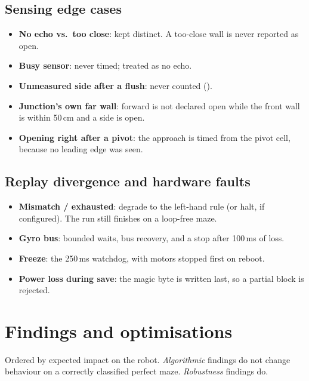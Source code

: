 \documentclass[11pt,a4paper]{article}
\newcommand{\code}[1]{\texttt{\detokenize{#1}}}
\theoremstyle{plain}
\theoremstyle{definition}
\begin{document}
\subsection{Sensing edge cases}
\begin{itemize}
  \item \textbf{No echo vs.\ too close}: kept distinct. A too-close wall is
        never reported as open.
  \item \textbf{Busy sensor}: never timed; treated as no echo.
  \item \textbf{Unmeasured side after a flush}: never counted
        (\code{Sonar_HasSample}).
  \item \textbf{Junction's own far wall}: forward is not declared open while
        the front wall is within 50\,cm and a side is open.
  \item \textbf{Opening right after a pivot}: the approach is timed from
        the pivot cell, because no leading edge was seen.
\end{itemize}

\subsection{Replay divergence and hardware faults}
\begin{itemize}
  \item \textbf{Mismatch / exhausted}: degrade to the left-hand rule (or
        halt, if configured). The run still finishes on a loop-free maze.
  \item \textbf{Gyro bus}: bounded waits, bus recovery, and a stop after
        100\,ms of loss.
  \item \textbf{Freeze}: the 250\,ms watchdog, with motors stopped first on
        reboot.
  \item \textbf{Power loss during save}: the magic byte is written last, so
        a partial block is rejected.
\end{itemize}

\section{Findings and optimisations}

Ordered by expected impact on the robot. \emph{Algorithmic} findings do not
change behaviour on a correctly classified perfect maze. \emph{Robustness}
findings do.
\end{document}
